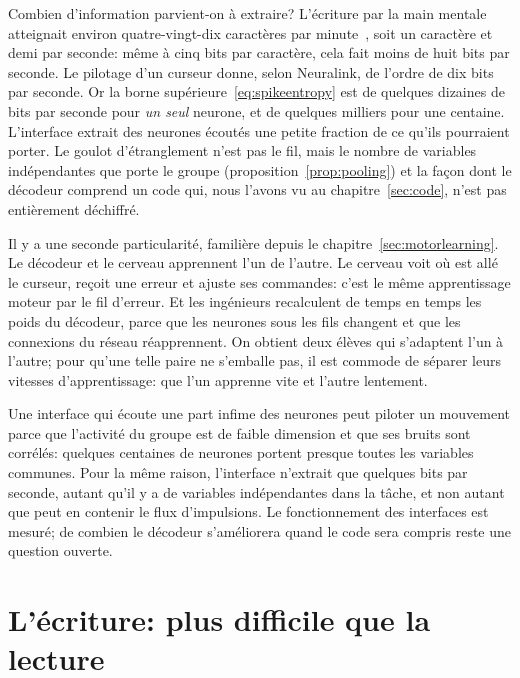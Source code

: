 Combien d'information parvient-on à extraire? L'écriture \og par la main mentale\fg{} atteignait environ quatre-vingt-dix caractères par minute~\cite{Willett2021}, soit un caractère et demi par seconde: même à cinq bits par caractère, cela fait moins de huit bits par seconde. Le pilotage d'un curseur donne, selon Neuralink, de l'ordre de dix bits par seconde. Or la borne supérieure~\eqref{eq:spikeentropy} est de quelques dizaines de bits par seconde pour \emph{un seul} neurone, et de quelques milliers pour une centaine. L'interface extrait des neurones écoutés une petite fraction de ce qu'ils pourraient porter. Le goulot d'étranglement n'est pas le fil, mais le nombre de variables indépendantes que porte le groupe (proposition~\ref{prop:pooling}) et la façon dont le décodeur comprend un code qui, nous l'avons vu au chapitre~\ref{sec:code}, n'est pas entièrement déchiffré.

Il y a une seconde particularité, familière depuis le chapitre~\ref{sec:motorlearning}. Le décodeur et le cerveau apprennent l'un de l'autre. Le cerveau voit où est allé le curseur, reçoit une erreur et ajuste ses commandes: c'est le même apprentissage moteur par le fil d'erreur. Et les ingénieurs recalculent de temps en temps les poids du décodeur, parce que les neurones sous les fils changent et que les connexions du réseau réapprennent. On obtient deux élèves qui s'adaptent l'un à l'autre; pour qu'une telle paire ne s'emballe pas, il est commode de séparer leurs vitesses d'apprentissage: que l'un apprenne vite et l'autre lentement.

\begin{keyblock}
\begin{proposition}
\label{prop:probe}
Une interface qui écoute une part infime des neurones peut piloter un mouvement parce que l'activité du groupe est de faible dimension et que ses bruits sont corrélés: quelques centaines de neurones portent presque toutes les variables communes. Pour la même raison, l'interface n'extrait que quelques bits par seconde, autant qu'il y a de variables indépendantes dans la tâche, et non autant que peut en contenir le flux d'impulsions. Le fonctionnement des interfaces est mesuré; de combien le décodeur s'améliorera quand le code sera compris reste une question ouverte.
\end{proposition}
\end{keyblock}

\section{L'écriture: plus difficile que la lecture}

